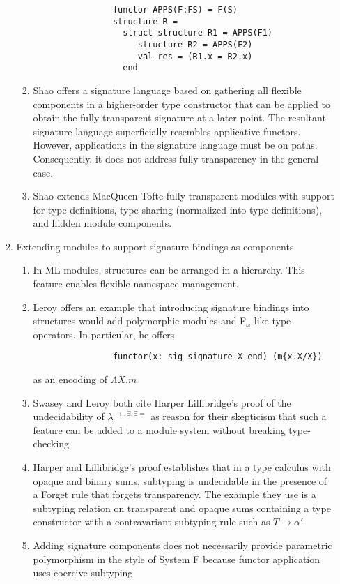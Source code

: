 \documentclass[12pt]{article}
\begin{document}
\begin{enumerate}
\begin{enumerate}
\begin{enumerate}
\begin{verbatim}
				functor APPS(F:FS) = F(S)
				structure R = 
				  struct structure R1 = APPS(F1)
					 structure R2 = APPS(F2)
					 val res = (R1.x = R2.x)
				  end
			\end{verbatim}
			\item Shao offers a signature language based on gathering all flexible components in a higher-order type constructor that can be applied to obtain the fully transparent signature at a later point. The resultant signature language superficially resembles applicative functors. However, applications in the signature language must be on paths. Consequently, it does not address fully transparency in the general case. 
			\item Shao \cite{shao98} extends MacQueen-Tofte fully transparent modules with support for type definitions, type sharing (normalized into type definitions), and hidden module components. 
		\end{enumerate}
		\item Extending modules to support signature bindings as components
		\begin{enumerate}
			\item In ML modules, structures can be arranged in a hierarchy. This feature enables flexible namespace management. 
			\item Leroy \cite{leroy94} offers an example that introducing signature bindings into structures would add polymorphic modules and F$_\omega$-like type operators. In particular, he offers 
			\begin{verbatim}
				functor(x: sig signature X end) (m{x.X/X})
			\end{verbatim}
			as an encoding of $\Lambda X.m$
			\item Swasey \cite{swasey06} and Leroy \cite{leroy94} both cite Harper Lillibridge's proof of the undecidability of $\lambda^{\rightarrow,\exists,\exists=}$ as reason for their skepticism that such a feature can be added to a module system without breaking type-checking
			\item Harper and Lillibridge's proof establishes that in a type calculus with opaque and binary sums, subtyping is undecidable in the presence of a Forget rule that forgets transparency. The example they use is a subtyping relation on transparent and opaque sums containing a type constructor with a contravariant subtyping rule such as $T\rightarrow \alpha'$
			\item Adding signature components does not necessarily provide parametric polymorphism in the style of System F because functor application uses coercive subtyping 

\end{enumerate}
\end{enumerate}
\end{enumerate}
\end{document}
